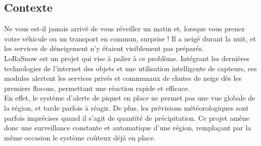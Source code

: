 \begin{summary}
\section{Contexte}

Ne vous est-il jamais arrivé de vous réveiller un matin et, lorsque vous prenez votre véhicule ou un 
transport en commun, surprise ! Il a neigé durant la nuit, et les services de déneigement n'y étaient
visiblement pas préparés.\\
LoRaSnow est un projet qui vise à palier à ce problème. Intégrant les dernières technologies de l'internet 
des objets et une utilisation intelligente de capteurs, ces modules alertent les services privés et
communaux de chutes de neige dès les premiers flocons, permettant une réaction rapide et efficace.\\
En effet, le système d'alerte de piquet en place ne permet pas une vue globale de la région, et tarde
parfois à réagir. De plus, les prévisions météorologiques sont parfois imprécises quand il s'agit de 
quantité de précipitation. Ce projet amène donc une surveillance constante et automatique d'une région,
remplaçant par la même occasion le système coûteux déjà en place.

\end{summary}